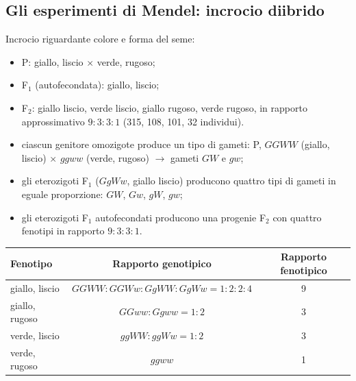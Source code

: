 \subsection{Gli esperimenti di Mendel: incrocio diibrido}

Incrocio riguardante colore e forma del seme:
\begin{itemize}
  \item P: giallo, liscio $\times$ verde, rugoso;
  \item F$_1$ (autofecondata): giallo, liscio;
  \item F$_2$: giallo liscio, verde liscio, giallo rugoso, verde rugoso, in rapporto approssimativo $9:3:3:1$ (315, 108, 101, 32 individui).
\end{itemize}

\begin{itemize}
  \item ciascun genitore omozigote produce un tipo di gameti: P, $GGWW$ (giallo, liscio) $\times$ $ggww$ (verde, rugoso) $\rightarrow$ gameti $GW$ e $gw$;
  \item gli eterozigoti F$_1$ ($GgWw$, giallo liscio) producono quattro tipi di gameti in eguale proporzione: $GW$, $Gw$, $gW$, $gw$;
  \item gli eterozigoti F$_1$ autofecondati producono una progenie F$_2$ con quattro fenotipi in rapporto $9:3:3:1$.
\end{itemize}

\begin{table}[htbp]
  \centering
  \small
  \renewcommand{\arraystretch}{1.3}
  \begin{tabularx}{\textwidth}{|X|c|c|}
    \hline
    \textbf{Fenotipo} & \textbf{Rapporto genotipico} & \textbf{Rapporto fenotipico} \\
    \hline
    giallo, liscio & $GGWW{:}GGWw{:}GgWW{:}GgWw = 1{:}2{:}2{:}4$ & 9 \\
    \hline
    giallo, rugoso & $GGww{:}Ggww = 1{:}2$ & 3 \\
    \hline
    verde, liscio & $ggWW{:}ggWw = 1{:}2$ & 3 \\
    \hline
    verde, rugoso & $ggww$ & 1 \\
    \hline
  \end{tabularx}
\end{table}

